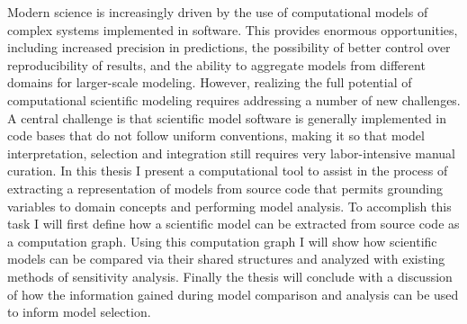 
Modern science is increasingly driven by the use of computational models of complex systems implemented in software.
This provides enormous opportunities, including increased precision in predictions, the possibility of better control over reproducibility of results, and the ability to aggregate models from different domains for larger-scale modeling.
However, realizing the full potential of computational scientific modeling requires addressing a number of new challenges.
A central challenge is that scientific model software is generally implemented in code bases that do not follow uniform conventions, making it so that model interpretation, selection and integration still requires very labor-intensive manual curation.
In this thesis I present a computational tool to assist in the process of extracting a representation of models from source code that permits grounding variables to domain concepts and performing model analysis.
To accomplish this task I will first define how a scientific model can be extracted from source code as a computation graph.
Using this computation graph I will show how scientific models can be compared via their shared structures and analyzed with existing methods of sensitivity analysis.
Finally the thesis will conclude with a discussion of how the information gained during model comparison and analysis can be used to inform model selection.
